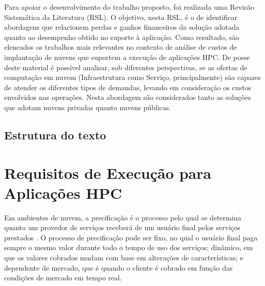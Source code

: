 \documentclass[tese,capa]{texufpel}
\begin{document}
Para apoiar o desenvolvimento do trabalho proposto, foi realizada uma Revisão Sistemática da Literatura (RSL). O objetivo, nesta RSL, é o de identificar abordagens que relacionem perdas e ganhos financeiros da solução adotada quanto ao desempenho obtido no suporte à aplicação. Como resultado, são elencados os trabalhos mais relevantes no contexto de análise de custos de implantação de nuvens que suportem a execução de aplicações HPC. De posse deste material é possível analisar, sob diferentes perspectivas, se as ofertas de computação em nuvem (Infraestrutura como Serviço, principalmente) são capazes de atender os diferentes tipos de demandas, levando em consideração os custos envolvidos nas operações. Nesta abordagem são considerados tanto as soluções que adotam nuvens privadas quanto nuvens públicas.

\section{Estrutura do texto}\label{sec:esttexto}


\chapter{Requisitos de Execução para Aplicações HPC}\label{chap:reqhpc}

Em ambientes de nuvem, a precificação é o processo pelo qual se determina quanto um provedor de serviços receberá de um usuário final pelos serviços prestados \cite{al-roomiCloudComputingPricing2013}. O processo de precificação pode ser fixo, no qual o usuário final paga sempre o mesmo valor durante todo o tempo de uso dos serviços; dinâmico, em que os valores cobrados mudam com base em alterações de características; e dependente de mercado, que é quando o cliente é cobrado em função das condições de mercado em tempo real.
\end{document}

